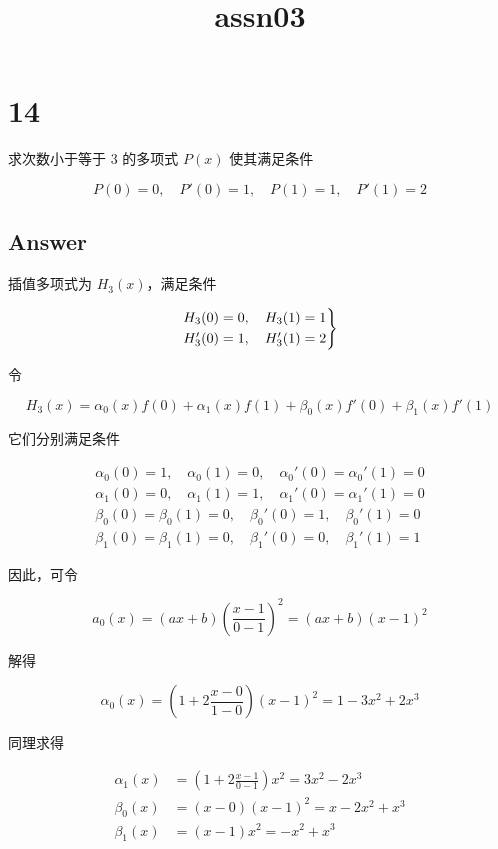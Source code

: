 \documentclass[11pt]{article}
\title{assn03}
\begin{document}
    
    \maketitle
    
    

    
    \section{14}\label{section}

求次数小于等于 3 的多项式 \(P(x)\) 使其满足条件

\[
P(0) = 0, \quad P'(0) = 1, \quad P(1) = 1, \quad P'(1) = 2
\]

\subsection{Answer}\label{answer}

插值多项式为 \(H_3(x)\)，满足条件

\[
\begin{rcases}
H_3(0) = 0, \quad H_3(1)=1 \\
H_3'(0) = 1, \quad H_3'(1)=2
\end{rcases}
\]

令

\[
H_3(x) = \alpha_0(x)f(0) + \alpha_1(x)f(1) + \beta_0(x)f'(0) + \beta_1(x)f'(1)
\]

它们分别满足条件

\[
\begin{aligned}
\alpha_0(0) = 1,\quad \alpha_0(1) = 0, \quad \alpha_0'(0) = \alpha_0'(1) = 0 \\
\alpha_1(0) = 0, \quad \alpha_1(1) = 1, \quad \alpha_1'(0) = \alpha_1'(1) = 0\\
\beta_0(0) = \beta_0(1) = 0, \quad \beta_0'(0) = 1, \quad \beta_0'(1) = 0 \\
\beta_1(0) = \beta_1(1) = 0, \quad \beta_1'(0) = 0, \quad \beta_1'(1) = 1
\end{aligned}
\]

因此，可令

\[
a_0(x) = (ax+b)\left( \frac{x - 1}{0 - 1} \right) ^2 = (ax+b)(x - 1)^2
\]

解得

\[
\alpha_0(x) = \left( 1 + 2\frac{x - 0}{1 - 0} \right) (x - 1)^2 = 1 - 3x^2 + 2x^3
\]

同理求得

\[
\begin{aligned}
    \alpha_1(x) &= (1 + 2\frac{x - 1}{0 - 1}) x^2 = 3x^2 - 2x^3 \\
    \beta_0(x) &= (x - 0)(x - 1)^2 = x - 2x^2 + x^3 \\
    \beta_1(x) &= (x - 1)x^2 = -x^2+x^3
\end{aligned}
\]
\end{document}
